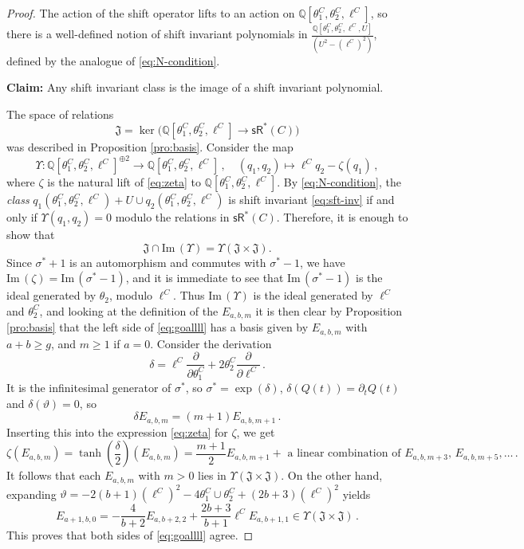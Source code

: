 \documentclass[11pt]{article}
\def\QQ{\mathbb{Q}}
\def\sR{\mathsf{sR}}
\def\im{\mathrm{Im}\,}
\newcommand{\sh}{\sigma}
\theoremstyle{definition}
\begin{document}
\begin{proof}
The action of the shift operator lifts to an action on $\QQ[\theta_1^C,\theta_2^C,\ell^C]$, so there is a well-defined notion of shift invariant polynomials in $\frac{\QQ[\theta_1^C, \theta_2^C, \ell^C, U]}{(U^2-(\ell^C)^2)}$, defined by the analogue of \eqref{eq:N-condition}.
    
    \textbf{Claim:} Any shift invariant class is the image of a shift invariant polynomial.
    
    The space of relations
    $$
    \mathfrak J = \ker \big(\QQ[\theta_1^C, \theta_2^C, \ell^C] \to \sR^*(C)\big)
    $$
    was described in Proposition \ref{pro:basis}. Consider the map
    $$
    \Upsilon : \QQ[\theta_1^C, \theta_2^C, \ell^C]^{\oplus 2}\to \QQ[\theta_1^C, \theta_2^C, \ell^C]\,, \quad (q_1, q_2) \mapsto \ell^Cq_2 - \zeta (q_1)\,,
    $$
    where $\zeta$ is the natural lift of \eqref{eq:zeta} to $\QQ[\theta_1^C, \theta_2^C, \ell^C]$. By \eqref{eq:N-condition}, the \emph{class} $q_1(\theta_1^C, \theta_2^C, \ell^C) + U \cup q_2(\theta_1^C, \theta_2^C, \ell^C)$ is shift invariant \eqref{eq:sft-inv} if and only if $\Upsilon(q_1, q_2) = 0$ modulo the relations in $\sR^*(C)$. Therefore, it is enough to show that
    \begin{equation}\label{eq:goallll}
    \mathfrak J \cap \im(\Upsilon) = \Upsilon(\mathfrak J \times \mathfrak J).
    \end{equation}
    Since $\sh^*+1$ is an automorphism and commutes with $\sh^{\ast}-1$, we have $\im(\zeta) = \im(\sh^* -1)$, and it is immediate to see that $\im(\sh^*-1)$ is the ideal generated by $\theta_2$, modulo $\ell^C$. Thus $\im (\Upsilon)$ is the ideal generated by $\ell^C$ and $\theta_2^C$, and looking at the definition of the $E_{a,b,m}$ it is then clear by Proposition \ref{pro:basis} that the left side of \eqref{eq:goallll} has a basis given by $E_{a,b,m}$ with $a+b \geq g$, and $m \geq 1$ if $a=0$.
    Consider the derivation
    $$
    \delta = \ell^C \frac{\partial}{\partial \theta_1^C} +2\theta_2^C \frac{\partial}{\partial \ell^C}\,.
    $$
    It is the infinitesimal generator of $\sh^*$, so $\sh^* = \exp(\delta)$, $\delta(Q(t)) = \partial_t Q(t)$ and $\delta(\vartheta) =0$, so
    $$
    \delta E_{a,b,m} =(m+1)E_{a,b,m+1}\,.
    $$
    Inserting this into the expression \eqref{eq:zeta} for $\zeta$, we get
    $$
    \zeta (E_{a,b,m}) = \tanh \left(\frac{\delta}{2}\right) (E_{a,b,m}) = \frac{m+1}{2}E_{a,b,m+1} + \text{ a linear combination of }E_{a,b,m+3}, \, E_{a,b,m+5},\ldots \,.
    $$
    It follows that each $E_{a,b,m}$ with $m>0$ lies in $\Upsilon(\mathfrak{J}\times\mathfrak{J})$. On the other hand, expanding $\vartheta = -2(b+1)(\ell^C)^2 -4\theta_1^C\cup \theta_2^C + (2b+3)(\ell^C)^2$ yields
    $$
    E_{a+1,b,0} = -\frac{4}{b+2} E_{a, b+2, 2} +  \frac{2b+3}{b+1}\ell^CE_{a, b+1,1} \in \Upsilon(\mathfrak J \times \mathfrak J)\,.
    $$
    This proves that both sides of \eqref{eq:goallll} agree.
    

\end{proof}
\end{document}

